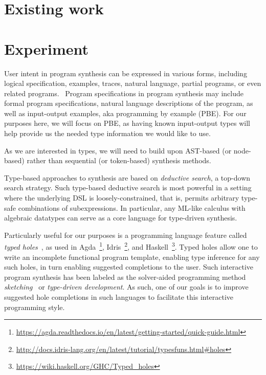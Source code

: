 \documentclass{article}
\begin{document}
\section{Existing work}



\section{Experiment}

User intent in program synthesis can be expressed in various forms, including logical specification, examples, traces, natural language, partial programs, or even related programs.~\citep{gulwani2017program}
Program specifications in program synthesis may include formal program specifications, natural language descriptions of the program, as well as input-output examples, aka programming by example (PBE).
For our purposes here, we will focus on PBE, as having known input-output types will help provide us the needed type information we would like to use.

As we are interested in types, we will need to build upon AST-based (or node-based) rather than sequential (or token-based) synthesis methods.

Type-based approaches to synthesis are based on \emph{deductive search}, a top-down search strategy.
Such type-based deductive search is most powerful in a setting where the underlying DSL is loosely-constrained, that is, permits arbitrary type-safe combinations of subexpressions. In particular, any ML-like calculus with algebraic datatypes can serve as a core language for type-driven synthesis.~\citep{gulwani2017program}

Particularly useful for our purposes is a programming language feature called \emph{typed holes}~\citep{hashimoto1997typed},
as used in Agda~\footnote{\url{https://agda.readthedocs.io/en/latest/getting-started/quick-guide.html}},
Idris~\footnote{\url{http://docs.idris-lang.org/en/latest/tutorial/typesfuns.html\#holes}},
and Haskell~\footnote{\url{https://wiki.haskell.org/GHC/Typed_holes}}.
Typed holes allow one to write an incomplete functional program template,
enabling type inference for any such holes, in turn enabling suggested completions to the user.
Such interactive program synthesis has been labeled as the solver-aided
programming method \emph{sketching}~\citep{gulwani2017program} or
\emph{type-driven development}.
As such, one of our goals is to improve suggested hole completions in such languages to facilitate this interactive programming style.
\end{document}
